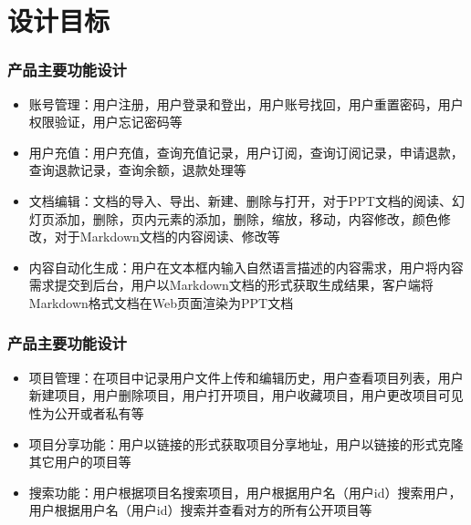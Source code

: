 \section{设计目标}
\begin{frame}
    \frametitle{产品主要功能设计}
    \begin{itemize}
        \item 账号管理：用户注册，用户登录和登出，用户账号找回，用户重置密码，用户权限验证，用户忘记密码等
        \item 用户充值：用户充值，查询充值记录，用户订阅，查询订阅记录，申请退款，查询退款记录，查询余额，退款处理等
        \item 文档编辑：文档的导入、导出、新建、删除与打开，对于PPT文档的阅读、幻灯页添加，删除，页内元素的添加，删除，缩放，移动，内容修改，颜色修改，对于Markdown文档的内容阅读、修改等
        \item 内容自动化生成：用户在文本框内输入自然语言描述的内容需求，用户将内容需求提交到后台，用户以Markdown文档的形式获取生成结果，客户端将Markdown格式文档在Web页面渲染为PPT文档
    \end{itemize}
\end{frame}

\begin{frame}
    \frametitle{产品主要功能设计}
    \begin{itemize}
        \item 项目管理：在项目中记录用户文件上传和编辑历史，用户查看项目列表，用户新建项目，用户删除项目，用户打开项目，用户收藏项目，用户更改项目可见性为公开或者私有等
        \item 项目分享功能：用户以链接的形式获取项目分享地址，用户以链接的形式克隆其它用户的项目等
        \item 搜索功能：用户根据项目名搜索项目，用户根据用户名（用户id）搜索用户，用户根据用户名（用户id）搜索并查看对方的所有公开项目等
    \end{itemize}
\end{frame}
